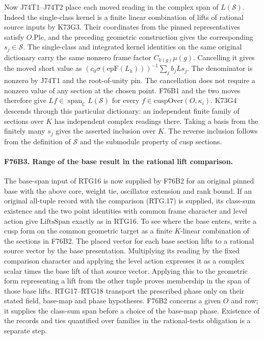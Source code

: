 Now J74T1--J74T2 place each moved reading in the complex span
of $L(\mathcal S)$. Indeed the single-class kernel is a finite
linear combination of lifts of rational source inputs by K73G3.
Their coordinates from the pinned representatives satisfy
$O.\mathrm{Plc}$, and the preceding geometric construction gives
the corresponding $s_j\in\mathcal S$. The single-class and
integrated kernel identities on the same original dictionary carry
the same nonzero frame factor $C_{k(g)}\mu(g)$. Cancelling it gives
the moved short value as
$(c_0\sigma(\mathrm{epF}(L_h)))^{-1}\sum_j b_j Ls_j$.
The denominator is nonzero by J74T1 and the root-of-unity pin.
The cancellation does not require a nonzero value of any section
at the chosen point. F76B1 and the two moves therefore give
$Lf\in\operatorname{span}_{\mathbb C}L(\mathcal S)$ for every
$f\in\mathrm{cuspOver}(O,\kappa_i)$. K73G4 descends through
this particular dictionary: an independent finite family of
sections over $K$ has independent complex readings there.
Taking a basis from the finitely many $s_j$ gives the asserted
inclusion over $K$. The reverse inclusion follows from the
definition of $\mathcal S$ and the submodule property of cusp
sections.

\paragraph{F76B3. Range of the base result in the rational lift comparison.}
The base-span input of RTG16 is now supplied by F76B2 for an
original pinned base with the above core, weight tie, oscillator
extension and rank bound. If an original all-tuple record with
the comparison (RTG.17) is supplied, its class-sum existence and
the two point identities with common frame character and level
action give $\mathrm{LiftsSpan}$ exactly as in RTG16. To see
where the base enters, write a cusp form on the common geometric
target as a finite $K$-linear combination of the sections in
F76B2. The placed vector for each base section lifts to a rational
source vector by the base presentation. Multiplying its reading
by the fixed comparison character and applying the level action
expresses it as a complex scalar times the base lift of that
source vector. Applying this to the geometric form representing
a lift from the other tuple proves membership in the span of
those base lifts. RTG17--RTG18 transport the prescribed phase
only on their stated field, base-map and phase hypotheses.
F76B2 concerns a given $O$ and row; it supplies the class-sum
span before a choice of the base-map phase. Existence of the
records and ties quantified over families in the rational-tests
obligation is a separate step.

